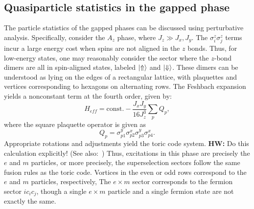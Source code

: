 \documentclass{article}
\newcommand{\hwnote}[1]{{\color{red}\textbf{HW:} #1}}
\begin{document}
\subsection{Quasiparticle statistics in the gapped phase}
The particle statistics of the gapped phases can be discussed using perturbative analysis.
Specifically, consider the $A_z$ phase, where $J_z \gg J_x, J_y$.
The $\sigma_i^z \sigma_j^z$ terms incur a large energy cost when spins are not aligned in the $z$ bonds.
Thus, for low-energy states, one may reasonably consider the sector where the $z$-bond dimers
are all in spin-aligned states, labeled $\ket{\Uparrow}$ and $\ket{\Downarrow}$.
These dimers can be understood as lying on the edges of a rectangular lattice,
with plaquettes and vertices corresponding to hexagons on alternating rows.
The Feshbach expansion yields a nonconstant term at the fourth order, given by:
\[
    H_{eff} = \text{const.} - \frac{J_x J_y}{16J_z^3} \sum_p Q_p,
\]
where the square plaquette operator is given as
\[
    Q_p = \sigma_{p1}^y \sigma_{p2}^x \sigma_{p3}^y \sigma_{p4}^x.
\]
Appropriate rotations and adjustments yield the toric code system.
\hwnote{Do this calculation explicitly! (See also:~\cite{kitaev_anyons})}
Thus, excitations in this phase are precisely the $e$ and $m$ particles,
or more precisely, the superselection sectors follow the same fusion rules as the toric code.
Vortices in the even or odd rows correspond to the $e$ and $m$ particles, respectively,
The $e \times m$ sector corresponds to the fermion sector $ic_i c_j$,
though a single $e \times m$ particle and a single fermion state are not exactly the same.

\printbibliography
\end{document}
